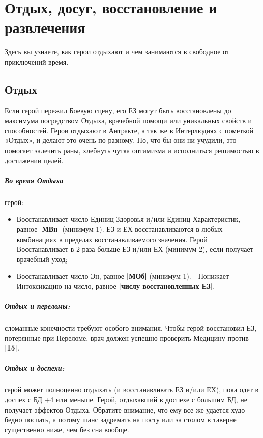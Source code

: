 \chapter{Отдых, досуг, восстановление и развлечения}
Здесь вы узнаете, как герои отдыхают и чем занимаются в свободное от приключений время. 

\section{Отдых}
Если герой пережил Боевую сцену, его ЕЗ могут быть восстановлены до максимума посредством Отдыха, врачебной помощи или уникальных свойств и способностей.
\newline Герои отдыхают в Антракте, а так же в Интерлюдиях с пометкой «Отдых», и делают это очень по-разному. Но, что бы они ни учудили, это помогает залечить раны, хлебнуть чутка оптимизма и исполниться решимостью в достижении целей.
\paragraph{Во время Отдыха} герой:
\begin{itemize}
  \item Восстанавливает число Единиц Здоровья и/или Единиц Характеристик, равное \textbf{|МВн|} (минимум 1). ЕЗ и ЕХ восстанавливаются в любых комбинациях в пределах восстанавливаемого значения. Герой Восстанавливает в 2 раза больше ЕЗ и/или ЕХ (минимум 2), если получает врачебный уход;
  \item Восстанавливает число Эн, равное \textbf{|МОб|} (минимум 1). - Понижает Интоксикацию на число, равное \textbf{|числу восстановленных ЕЗ|}.
\end{itemize}
\paragraph{Отдых и переломы:} сломанные конечности требуют особого внимания. Чтобы герой восстановил ЕЗ, потерянные при Переломе, врач должен успешно проверить Медицину против \textbf{|15|}. 
\paragraph{Отдых и доспехи:} герой может полноценно отдыхать (и восстанавливать ЕЗ и/или ЕХ), пока одет в доспех с БД +4 или меньше. Герой, отдыхавший в доспехе с большим БД, не получает эффектов Отдыха. Обратите внимание, что ему все же удается худо-бедно поспать, а потому шанс задремать на посту или за столом в таверне существенно ниже, чем без сна вообще.

